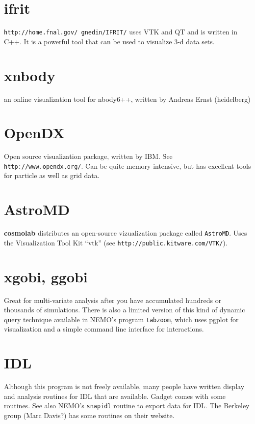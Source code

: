 \section{ifrit}

{\tt http://home.fnal.gov/~gnedin/IFRIT/}
uses VTK and QT and is
written in C++. It is a powerful
tool that can be used to visualize 3-d data sets.

\section{xnbody}

an online visualization tool for nbody6++, written by
Andreas Ernst (heidelberg)

\section{OpenDX}

Open source visualization package, written by IBM. See 
{\tt http://www.opendx.org/}. Can be quite memory intensive, but has
excellent tools for particle as well as grid data.

\section{AstroMD}

{\bf cosmolab} distributes an open-source vizualization package 
called {\tt AstroMD}.  Uses the Visualization Tool Kit ``vtk''
(see {\tt http://public.kitware.com/VTK/}).

\section{xgobi, ggobi}

Great for multi-variate analysis after you have accumulated hundreds
or thousands of simulations. There is also a limited version of
this kind of dynamic query technique available in 
NEMO's program {\tt tabzoom}, which uses pgplot for visualization
and a simple command line interface for interactions.


\section{IDL}

Although this program is not freely available, 
many people have written display and 
analysis routines for IDL that are available.
Gadget comes with some
routines. See also NEMO's {\tt snapidl} routine to export data for IDL.
The Berkeley group (Marc Davis?) has some routines on their website.

